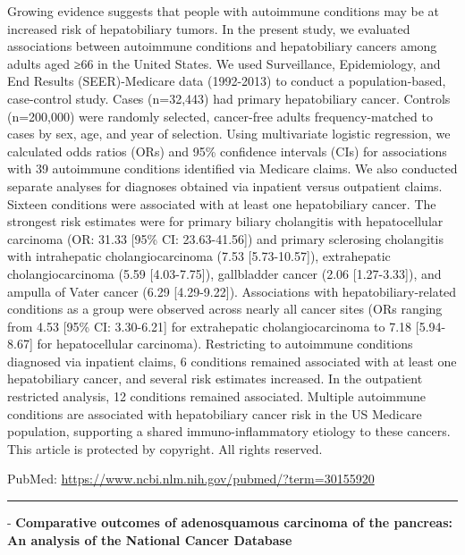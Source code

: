 \documentclass[]{article}
\begin{document}
Growing evidence suggests that people with autoimmune conditions may be
at increased risk of hepatobiliary tumors. In the present study, we
evaluated associations between autoimmune conditions and hepatobiliary
cancers among adults aged ≥66 in the United States. We used
Surveillance, Epidemiology, and End Results (SEER)-Medicare data
(1992-2013) to conduct a population-based, case-control study. Cases
(n=32,443) had primary hepatobiliary cancer. Controls (n=200,000) were
randomly selected, cancer-free adults frequency-matched to cases by sex,
age, and year of selection. Using multivariate logistic regression, we
calculated odds ratios (ORs) and 95\% confidence intervals (CIs) for
associations with 39 autoimmune conditions identified via Medicare
claims. We also conducted separate analyses for diagnoses obtained via
inpatient versus outpatient claims. Sixteen conditions were associated
with at least one hepatobiliary cancer. The strongest risk estimates
were for primary biliary cholangitis with hepatocellular carcinoma (OR:
31.33 {[}95\% CI: 23.63-41.56{]}) and primary sclerosing cholangitis
with intrahepatic cholangiocarcinoma (7.53 {[}5.73-10.57{]}),
extrahepatic cholangiocarcinoma (5.59 {[}4.03-7.75{]}), gallbladder
cancer (2.06 {[}1.27-3.33{]}), and ampulla of Vater cancer (6.29
{[}4.29-9.22{]}). Associations with hepatobiliary-related conditions as
a group were observed across nearly all cancer sites (ORs ranging from
4.53 {[}95\% CI: 3.30-6.21{]} for extrahepatic cholangiocarcinoma to
7.18 {[}5.94-8.67{]} for hepatocellular carcinoma). Restricting to
autoimmune conditions diagnosed via inpatient claims, 6 conditions
remained associated with at least one hepatobiliary cancer, and several
risk estimates increased. In the outpatient restricted analysis, 12
conditions remained associated. Multiple autoimmune conditions are
associated with hepatobiliary cancer risk in the US Medicare population,
supporting a shared immuno-inflammatory etiology to these cancers. This
article is protected by copyright. All rights reserved.

PubMed: \url{https://www.ncbi.nlm.nih.gov/pubmed/?term=30155920}

{}

{}

\begin{center}\rule{0.5\linewidth}{\linethickness}\end{center}

 - \textbf{Comparative outcomes of adenosquamous carcinoma of the
pancreas: An analysis of the National Cancer Database}
\end{document}
